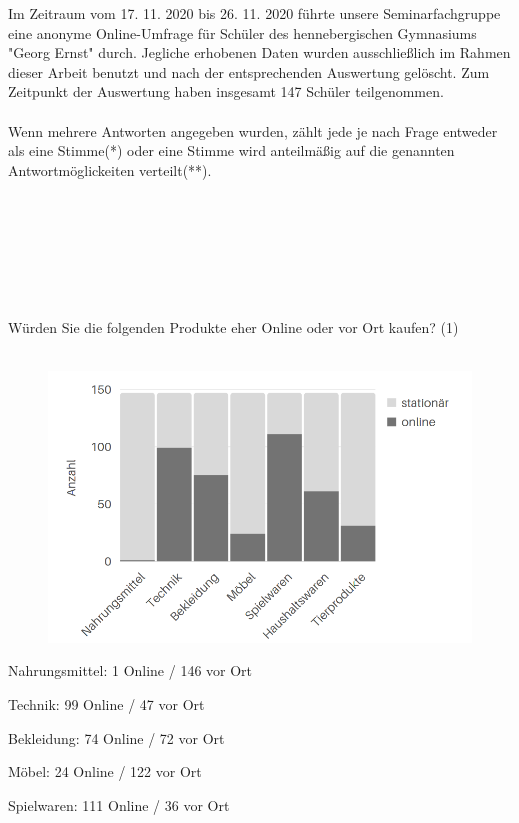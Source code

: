 \normalsize
Im Zeitraum vom 17. 11. 2020 bis 26. 11. 2020 führte unsere Seminarfachgruppe eine anonyme Online-Umfrage für Schüler des hennebergischen Gymnasiums "Georg Ernst" durch. Jegliche erhobenen Daten wurden ausschließlich im Rahmen dieser Arbeit benutzt und nach der entsprechenden Auswertung gelöscht. Zum Zeitpunkt der Auswertung haben insgesamt 147 Schüler teilgenommen.\\\\
Wenn mehrere Antworten angegeben wurden, zählt jede je nach Frage entweder als eine Stimme(*) oder eine Stimme wird anteilmäßig auf die genannten Antwortmöglickeiten verteilt(**).\\\\\\\\\\\\\\\\
Würden Sie die folgenden Produkte eher Online oder vor Ort kaufen? (1)\\\\
\begin{figure}[H]
    \begin{center}
        \includegraphics[width=12.5cm]{media/schuelerumfrage/1.png}
    \end{center}
\end{figure} 
\iffalse
Nahrungsmittel: 1 Online / 146 vor Ort

Technik: 99 Online / 47 vor Ort

Bekleidung: 74 Online / 72 vor Ort

Möbel: 24 Online / 122 vor Ort

Spielwaren: 111 Online / 36 vor Ort

